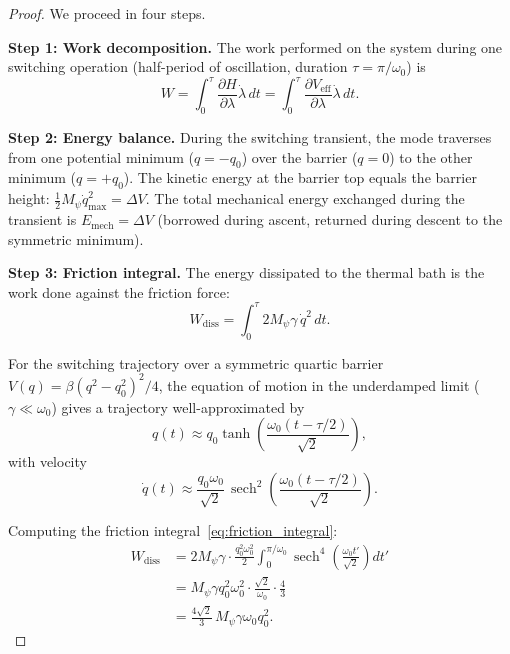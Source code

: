 \documentclass[11pt,twocolumn]{article}
\theoremstyle{definition}
\theoremstyle{remark}
\DeclareMathOperator{\sech}{sech}
\begin{document}
\begin{proof}
We proceed in four steps.

\textbf{Step 1: Work decomposition.}
The work performed on the system during one switching operation
(half-period of oscillation, duration $\tau = \pi/\omega_0$) is
\begin{equation}
W = \int_0^\tau \frac{\partial H}{\partial\lambda}\dot{\lambda}\,dt
= \int_0^\tau \frac{\partial V_{\mathrm{eff}}}{\partial\lambda}\dot{\lambda}\,dt.
\end{equation}

\textbf{Step 2: Energy balance.}
During the switching transient, the mode traverses from one potential
minimum ($q = -q_0$) over the barrier ($q = 0$) to the other minimum
($q = +q_0$). The kinetic energy at the barrier top equals the barrier
height: $\frac{1}{2}M_\psi\dot{q}_{\max}^2 = \Delta V$. The total
mechanical energy exchanged during the transient is $E_{\mathrm{mech}} =
\Delta V$ (borrowed during ascent, returned during descent to the
symmetric minimum).

\textbf{Step 3: Friction integral.}
The energy dissipated to the thermal bath is the work done against the
friction force:
\begin{equation}
W_{\mathrm{diss}} = \int_0^\tau 2M_\psi\gamma\,\dot{q}^2\,dt.
\label{eq:friction_integral}
\end{equation}

For the switching trajectory over a symmetric quartic barrier $V(q) =
\beta(q^2 - q_0^2)^2/4$, the equation of motion in the underdamped
limit ($\gamma \ll \omega_0$) gives a trajectory well-approximated by
\begin{equation}
q(t) \approx q_0\tanh\!\left(\frac{\omega_0(t - \tau/2)}{\sqrt{2}}\right),
\end{equation}
with velocity
\begin{equation}
\dot{q}(t) \approx \frac{q_0\omega_0}{\sqrt{2}}\,\sech^2\!\left(\frac{\omega_0(t-\tau/2)}{\sqrt{2}}\right).
\end{equation}

Computing the friction integral~\eqref{eq:friction_integral}:
\begin{align}
W_{\mathrm{diss}} &= 2M_\psi\gamma \cdot \frac{q_0^2\omega_0^2}{2}
\int_0^{\pi/\omega_0}\sech^4\!\left(\frac{\omega_0 t'}{\sqrt{2}}\right)dt'
\nonumber\\
&= M_\psi\gamma q_0^2\omega_0^2
\cdot\frac{\sqrt{2}}{\omega_0}\cdot\frac{4}{3}\nonumber\\
&= \frac{4\sqrt{2}}{3}\,M_\psi\gamma\omega_0 q_0^2.
\label{eq:friction_exact}
\end{align}


\end{proof}
\end{document}
